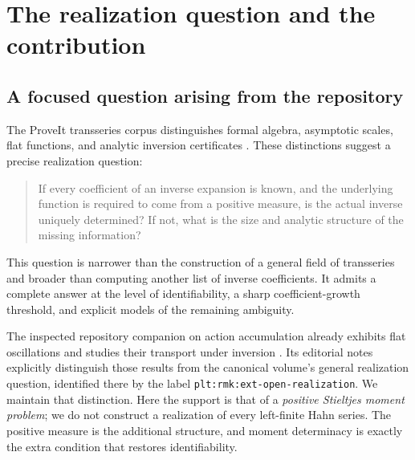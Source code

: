 \documentclass[11pt,a4paper]{article}
\numberwithin{equation}{section}
\theoremstyle{definition}
\theoremstyle{remark}
\begin{document}
\section{The realization question and the contribution}
\label{sec:context}

\subsection{A focused question arising from the repository}
The ProveIt transseries corpus distinguishes formal algebra, asymptotic
scales, flat functions, and analytic inversion certificates
\cite{repo-main,repo-series}. These distinctions suggest a precise
realization question:
\begin{quote}
If every coefficient of an inverse expansion is known, and the
underlying function is required to come from a positive measure, is the
actual inverse uniquely determined? If not, what is the size and analytic
structure of the missing information?
\end{quote}
This question is narrower than the construction of a general field of
transseries and broader than computing another list of inverse
coefficients. It admits a complete answer at the level of identifiability,
a sharp coefficient-growth threshold, and explicit models of the
remaining ambiguity.

The inspected repository companion on action accumulation already
exhibits flat oscillations and studies their transport under inversion
\cite{repo-action}. Its editorial notes explicitly distinguish those
results from the canonical volume's general realization question,
identified there by the label
\texttt{plt:rmk:ext-open-realization}. We maintain that distinction.
Here the support is that of a \emph{positive Stieltjes moment problem};
we do not construct a realization of every left-finite Hahn series.
The positive measure is the additional structure, and moment
determinacy is exactly the extra condition that restores identifiability.
\end{document}
